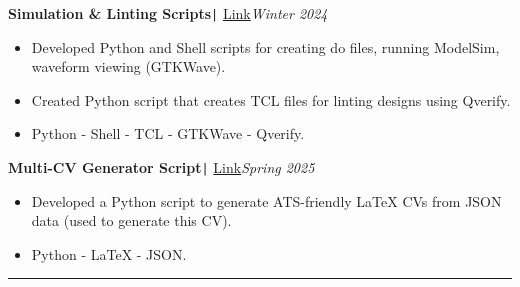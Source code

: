 \documentclass[11pt,a4paper]{article}
\begin{document}
\vspace{-0.3cm}
\begin{flushleft}
\textbf{Simulation \& Linting Scripts}\texttt{|} {\href{https://github.com/salah0eldin/Scripts}{Link}}\hfill\textit{Winter 2024}\\
\end{flushleft}
\vspace{-0.6cm}
\begin{itemize}
\item \setlength{\itemsep}{-0.0em} Developed Python and Shell scripts for creating do files, running ModelSim, waveform viewing (GTKWave).
\item \setlength{\itemsep}{-0.0em} Created Python script that creates TCL files for linting designs using Qverify.
\item \setlength{\itemsep}{-0.0em} Python - Shell - TCL - GTKWave - Qverify.
\end{itemize}
\vspace{-0.3cm}
\begin{flushleft}
\textbf{Multi-CV Generator Script}\texttt{|} {\href{https://github.com/salah0eldin/CV}{Link}}\hfill\textit{Spring 2025}\\
\end{flushleft}
\vspace{-0.6cm}
\begin{itemize}
\item \setlength{\itemsep}{-0.0em} Developed a Python script to generate ATS-friendly LaTeX CVs from JSON data (used to generate this CV).
\item \setlength{\itemsep}{-0.0em} Python - LaTeX - JSON.
\end{itemize}
\vspace{-0.3cm}
\vspace{-0.2cm}
\rule{\textwidth}{0.3pt}\\
\newpage
\vspace{-0.5cm}
\centering
\end{document}
